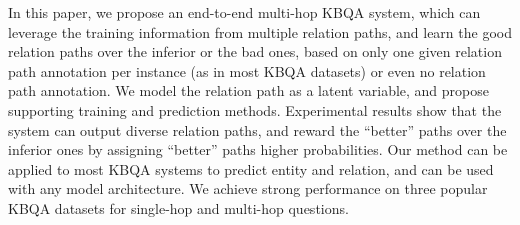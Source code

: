 In this paper, we propose an end-to-end multi-hop KBQA system, which can leverage the training information from multiple relation paths, and learn the good relation paths over the inferior or the bad ones, based on only one given relation path annotation per instance (as in most KBQA datasets) or even no relation path annotation. We model the relation path as a latent variable, and propose supporting training and prediction methods. Experimental results show that the system can output diverse relation paths, and reward the ``better'' paths over the inferior ones by assigning ``better'' paths higher probabilities. Our method can be applied to most KBQA systems to predict entity and relation, and can be used with any model architecture. We achieve strong performance on three popular KBQA datasets for single-hop and multi-hop questions.  %
